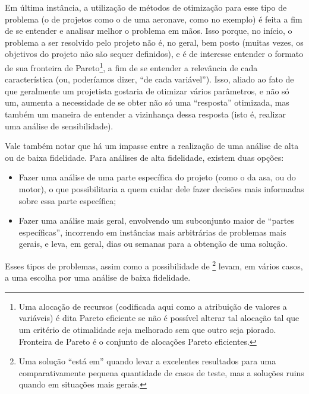 Em última instância, a utilização de métodos de otimização para esse
tipo de problema (o de projetos como o de uma aeronave, como no
exemplo) é feita a fim de se entender e analisar melhor o problema em
mãos. Isso porque, no início, o problema a ser resolvido pelo projeto
não é, no geral, bem posto (muitas vezes, os objetivos do projeto não
são sequer definidos\cite{hoburg}), e é de interesse entender o
formato de sua fronteira de Pareto\footnote{Uma alocação de recursos
  (codificada aqui como a atribuição de valores a variáveis) é dita
  Pareto eficiente se não é possível alterar tal alocação tal que um
  critério de otimalidade seja melhorado sem que outro seja
  piorado. Fronteira de Pareto é o conjunto de alocações Pareto
  eficientes.}, a fim de se entender a relevância de cada
característica (ou, poderíamos dizer, ``de cada variável'').  Isso,
aliado ao fato de que geralmente um projetista gostaria de otimizar
vários parâmetros, e não só um, aumenta a necessidade de se obter não
só uma ``resposta'' otimizada, mas também um maneira de entender a
vizinhança dessa resposta (isto é, realizar uma análise de
sensibilidade).

Vale também notar que há um impasse entre a realização de uma análise
de alta ou de baixa fidelidade. Para análises de alta fidelidade,
existem duas opções:

\begin{itemize}
\item Fazer uma análise de uma parte específica do projeto (como o da
  asa, ou do motor), o que possibilitaria a quem cuidar dele fazer
  decisões mais informadas sobre essa parte específica;
\item Fazer uma análise mais geral, envolvendo um subconjunto maior de
  ``partes específicas'', incorrendo em instâncias mais arbitrárias de
  problemas mais gerais, e leva, em geral, dias ou semanas para a
  obtenção de uma solução.
\end{itemize}

Esses tipos de problemas, assim como a possibilidade de
 \footnote{Uma solução ``está em''
   quando levar a excelentes resultados para uma
  comparativamente pequena quantidade de casos de teste, mas a
  soluções ruins quando em situações mais gerais.} levam, em vários
casos, a uma escolha por uma análise de baixa fidelidade.


